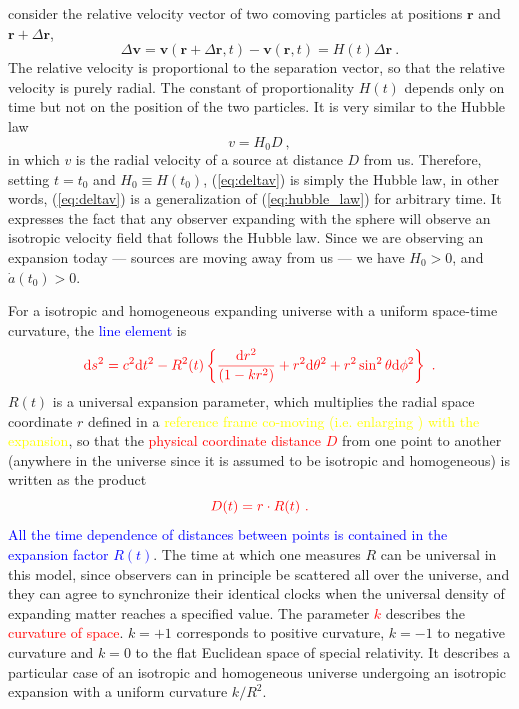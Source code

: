 \documentclass[12pt,a4paper]{article}
\renewcommand{\vec}[1]{\boldsymbol{#1}}
\newcommand{\dif}{\mathrm{d}}
\begin{document}
consider the relative velocity vector of two comoving particles at positions $\vec{r}$ and $\vec{r} + \Delta \vec{r}$, 
\begin{equation}
\Delta \vec{v} = \vec{v}(\vec{r} +\Delta \vec{r}, t) -\vec{v}(\vec{r}, t) = H(t) \Delta \vec{r} ~.
\label{eq:deltav}
\end{equation}
The relative velocity is proportional to the separation vector, so that the relative velocity is purely radial. The constant of proportionality $H(t)$ depends only on time but not on the position of the two particles. It is very similar to the Hubble law
\begin{equation}
v = H_0 D ~,
\label{eq:hubble_law}
\end{equation}
in which $v$ is the radial velocity of a source at distance $D$ from us. Therefore, setting $t = t_0$ and $H_0 \equiv H(t_0)$, (\ref{eq:deltav}) is simply the Hubble law, in other words, (\ref{eq:deltav}) is a generalization of (\ref{eq:hubble_law}) for arbitrary time. It expresses the fact that any observer expanding with the sphere will observe an isotropic velocity field that follows the Hubble law. Since we are observing an expansion today --- sources are moving away from us --- we have $H_0 > 0$, and $\dot{a}(t_0) > 0$.





\cite{perkins2008particle} For a isotropic and homogeneous expanding universe with a uniform space-time curvature, the \textcolor{blue}{line element} is
\begin{equation}
\color{red} \dif s^2 = c^2 \dif t^2 -R^2(t)\left\lbrace \frac{\dif r^2}{(1-kr^2)} +r^2 \dif \theta^2 +r^2 \sin^2 \theta \dif \phi^2 \right\rbrace ~.
\end{equation}
$R(t)$ is a universal expansion parameter, which multiplies the radial space coordinate $r$ defined in a \textcolor{yellow}{reference frame co-moving (i.e. enlarging ) with the expansion}, so that the \textcolor{red}{physical coordinate distance $D$} from one point to another (anywhere in the universe since it is assumed to be isotropic and homogeneous) is written as the product
\begin{equation}
\color{red} D(t) = r \cdot R(t) ~.
\end{equation}
\textcolor{blue}{All the time dependence of distances between points is contained in the expansion factor $R(t)$}. The time at which one measures $R$ can be universal in this model, since observers can in principle be scattered all over the universe, and they can agree to synchronize their identical clocks when the universal density of expanding matter reaches a specified value. The parameter \textcolor{red}{$k$} describes the \textcolor{red}{curvature of space}. $k = +1$ corresponds to positive curvature, $k = -1$ to negative curvature and $k = 0$ to the flat Euclidean space of special relativity. It describes a particular case of an isotropic and homogeneous universe undergoing an isotropic expansion with a uniform curvature $k/R^2$.
\end{document}
